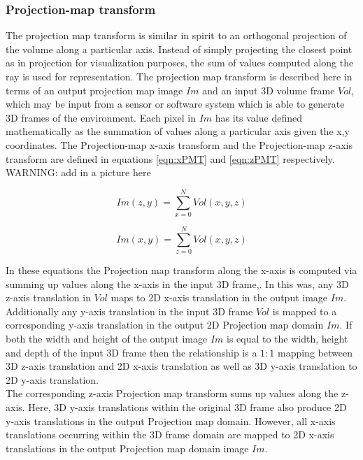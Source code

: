 \subsubsection{Projection-map transform}
\label{sec:PMTramsform}

The projection map transform is similar in spirit to an orthogonal projection of the volume along a particular axis. Instead of simply projecting the closest point as in projection for visualization purposes, the sum of values computed along the ray is used for representation. The projection map transform is described here in terms of an output projection map image $Im$ and an input 3D volume frame $Vol$, which may be input from a sensor or software system which is able to generate 3D frames of the environment. Each pixel in $Im$ has its value defined mathematically as the summation of values along a particular axis given the x,y coordinates. The Projection-map x-axis transform and the Projection-map z-axis transform are defined in equations \ref{eqn:xPMT} and \ref{eqn:zPMT} respectively. \\

WARNING: add in a picture here

\begin{equation} \label{eqn:xPMT}
Im(z,y) = \sum_{x=0}^{N}{Vol(x,y,z)}
\end{equation}

\begin{equation} \label{eqn:zPMT}
Im(x,y) = \sum_{z=0}^{N}{Vol(x,y,z)}
\end{equation}

In these equations the Projection map transform along the x-axis is computed via summing up values along the x-axis in the input 3D frame,. In this was, any 3D z-axis translation in $Vol$ maps to 2D x-axis translation in the output image $Im$. Additionally any y-axis translation in the input 3D frame $Vol$ is mapped to a corresponding y-axis translation in the output 2D Projection map domain $Im$. If both the width and height of the output image $Im$ is equal to the width, height and depth of the input 3D frame then the relationship is a $1:1$ mapping between 3D z-axis translation and 2D x-axis translation as well as 3D y-axis translation to 2D y-axis translation. \\

The corresponding z-axis Projection map transform sums up values along the z-axis. Here, 3D y-axis translations within the original 3D frame also produce 2D y-axis translations in the output Projection map domain. However, all x-axis translations occurring within the 3D frame domain are mapped to 2D x-axis translations in the output Projection map domain image $Im$. \\

